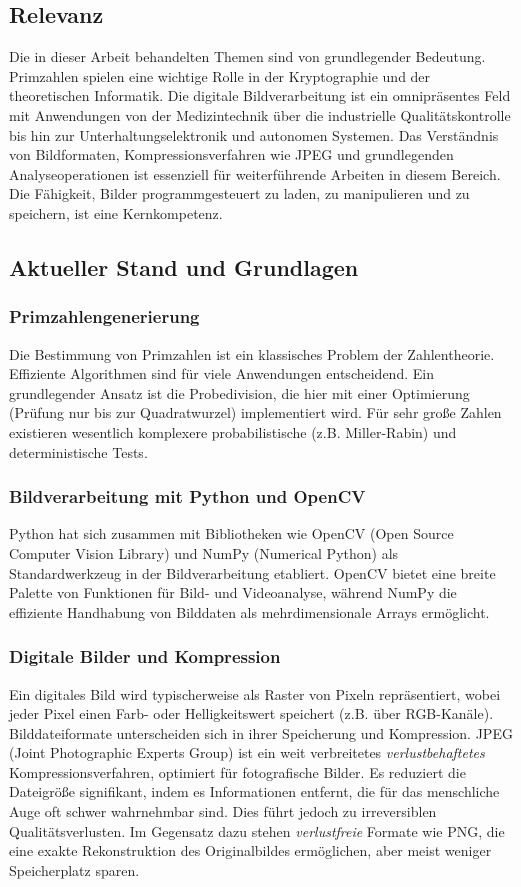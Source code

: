 \documentclass[11pt, a4paper]{article}
\begin{document}
\subsection{Relevanz}
Die in dieser Arbeit behandelten Themen sind von grundlegender Bedeutung. Primzahlen spielen eine wichtige Rolle in der Kryptographie und der theoretischen Informatik. Die digitale Bildverarbeitung ist ein omnipräsentes Feld mit Anwendungen von der Medizintechnik über die industrielle Qualitätskontrolle bis hin zur Unterhaltungselektronik und autonomen Systemen. Das Verständnis von Bildformaten, Kompressionsverfahren wie JPEG und grundlegenden Analyseoperationen ist essenziell für weiterführende Arbeiten in diesem Bereich. Die Fähigkeit, Bilder programmgesteuert zu laden, zu manipulieren und zu speichern, ist eine Kernkompetenz.

\subsection{Aktueller Stand und Grundlagen}
\subsubsection{Primzahlengenerierung}
Die Bestimmung von Primzahlen ist ein klassisches Problem der Zahlentheorie. Effiziente Algorithmen sind für viele Anwendungen entscheidend. Ein grundlegender Ansatz ist die Probedivision, die hier mit einer Optimierung (Prüfung nur bis zur Quadratwurzel) implementiert wird. Für sehr große Zahlen existieren wesentlich komplexere probabilistische (z.B. Miller-Rabin) und deterministische Tests.

\subsubsection{Bildverarbeitung mit Python und OpenCV}
Python hat sich zusammen mit Bibliotheken wie OpenCV (Open Source Computer Vision Library) und NumPy (Numerical Python) als Standardwerkzeug in der Bildverarbeitung etabliert. OpenCV bietet eine breite Palette von Funktionen für Bild- und Videoanalyse, während NumPy die effiziente Handhabung von Bilddaten als mehrdimensionale Arrays ermöglicht.

\subsubsection{Digitale Bilder und Kompression}
Ein digitales Bild wird typischerweise als Raster von Pixeln repräsentiert, wobei jeder Pixel einen Farb- oder Helligkeitswert speichert (z.B. über RGB-Kanäle). Bilddateiformate unterscheiden sich in ihrer Speicherung und Kompression. JPEG (Joint Photographic Experts Group) ist ein weit verbreitetes \textit{verlustbehaftetes} Kompressionsverfahren, optimiert für fotografische Bilder. Es reduziert die Dateigröße signifikant, indem es Informationen entfernt, die für das menschliche Auge oft schwer wahrnehmbar sind. Dies führt jedoch zu irreversiblen Qualitätsverlusten. Im Gegensatz dazu stehen \textit{verlustfreie} Formate wie PNG, die eine exakte Rekonstruktion des Originalbildes ermöglichen, aber meist weniger Speicherplatz sparen.
\end{document}
